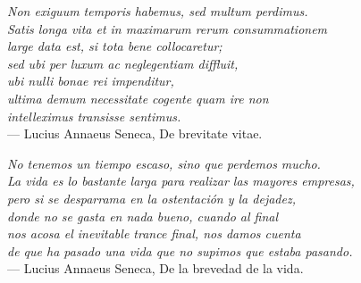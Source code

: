 \thispagestyle{empty}
{}

\vspace*{1cm}


\begin{flushright}{\slshape
		Non exiguum temporis habemus, sed multum perdimus. \\
		Satis longa vita et in maximarum rerum consummationem\\
		large data est, si tota bene collocaretur;\\
		sed ubi per luxum ac neglegentiam diffluit,\\
		ubi nulli bonae rei impenditur, \\
		ultima demum necessitate cogente quam ire non \\
		intelleximus transisse sentimus.} \\ \medskip
		--- Lucius Annaeus Seneca, De brevitate vitae.
		
		\bigskip
		\bigskip
		
		{\slshape
		No tenemos un tiempo escaso, sino que perdemos mucho. \\
		La vida es lo bastante larga para realizar las mayores empresas,\\
		pero si se desparrama en la ostentación y la dejadez,\\
		donde no se gasta en nada bueno, cuando al final \\
		nos acosa el inevitable trance final, nos damos cuenta \\
		de que ha pasado una vida que no supimos que estaba pasando.} \\ \medskip
		--- Lucius Annaeus Seneca, De la brevedad de la vida.
		
\end{flushright}

%
